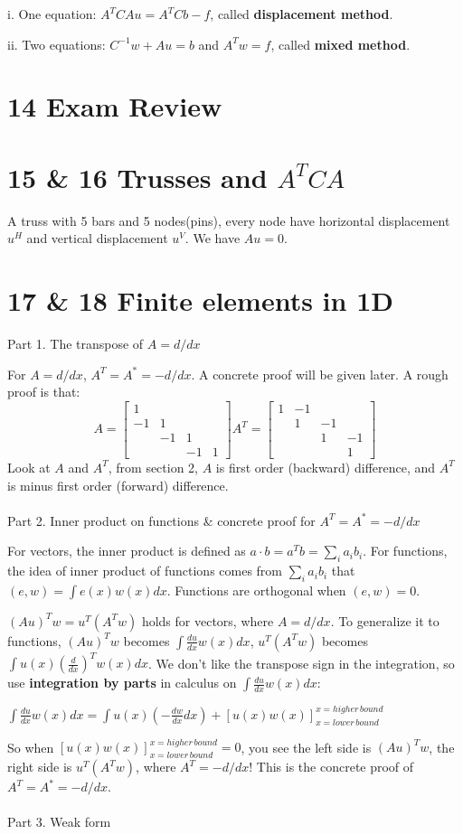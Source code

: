 \documentclass{article}
\newenvironment{nscenter}
{\parskip=0pt\par\nopagebreak\centering}
{\par\noindent\ignorespacesafterend}
\begin{document}
\begin{spacing}{1.5}
i. One equation: $A^TCAu=A^TCb-f$, called {\bfseries displacement method}. 

ii. Two equations: $C^{-1}w+Au=b$ and $A^Tw=f$,  called {\bfseries mixed method}.

\section*{14 Exam Review}

\section*{15 \& 16 Trusses and $A^TCA$}
A truss with 5 bars and 5 nodes(pins), every node have horizontal displacement $u^H$ and vertical displacement $u^V$. We have $Au=0$.


\section*{17 \& 18 Finite elements in 1D}
Part 1. The transpose of $A=d/dx$

For $A=d/dx$, $A^T=A^*=-d/dx$. A concrete proof will be given later. A rough proof is that:
$$
A=
\begin{bmatrix}
1 &  &  &  \\
-1 & 1 &  &  \\
 & -1 & 1 &  \\
 &  & -1 & 1
\end{bmatrix}
A^T=
\begin{bmatrix}
1 & -1 &  &  \\
 & 1 & -1 &  \\
&  & 1 & -1 \\
&  &  & 1
\end{bmatrix}
$$
Look at $A$ and $A^T$, from section 2, $A$ is first order (backward) difference, and $A^T$ is minus first order (forward) difference.
\\\\ Part 2. Inner product on functions \& concrete proof for $A^T=A^*=-d/dx$

For vectors, the inner product is defined as $a \cdot b=a^Tb=\sum_i a_ib_i$. For functions, the idea of inner product of functions comes from $\sum_i a_ib_i$ that $(e, w)=\int e(x)w(x)dx$. Functions are orthogonal when $(e, w)=0$.

$(Au)^Tw=u^T(A^Tw)$ holds for vectors, where $A=d/dx$. To generalize it to functions, $(Au)^Tw$ becomes $\int \frac{du}{dx}w(x)dx$, $u^T(A^Tw)$ becomes $\int u(x)(\frac{d}{dx})^Tw(x)dx$. We don't like the transpose sign in the integration, so use {\bfseries integration by parts} in calculus on $\int \frac{du}{dx}w(x)dx$: 
\begin{nscenter}
$\int \frac{du}{dx}w(x)dx=\int u(x)(-\frac{dw}{dx}dx)+ [u(x)w(x)]_{x=lower \, bound}^{x=higher \,  bound}$
\end{nscenter}
So when $[u(x)w(x)]_{x=lower \, bound}^{x=higher \,  bound} = 0$, you see the left side is $(Au)^Tw$, the right side is $u^T(A^Tw)$, where $A^T=-d/dx$! This is the concrete proof of $A^T=A^*=-d/dx$.
\\\\ Part 3. Weak form


\end{spacing}
\end{document}
